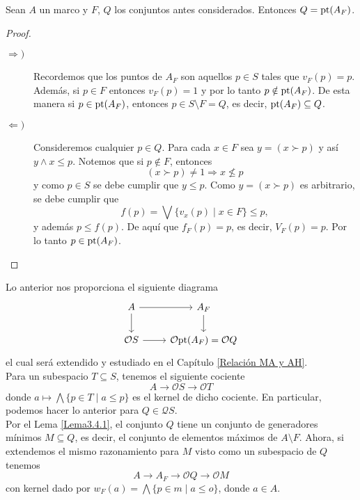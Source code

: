 \begin{lem}\label{Lema5.7.1}
    Sean $A$ un marco y $F$, $Q$ los conjuntos antes considerados. Entonces $Q=\mathrm{pt}(A_F)$.
\end{lem}

\begin{proof}
\begin{description}
    \item[$\Rightarrow) $] Recordemos que los puntos de $A_F$ son aquellos $p\in S$ tales que $v_F(p)=p$. Además, si $p\in F$ entonces $v_F(p)=1$ y por lo tanto $p\notin \mathrm{pt}(A_F)$. De esta manera si $p\in \mathrm{pt}(A_F)$, entonces $p\in S\setminus F=Q$, es decir, $\mathrm{pt}(A_F)\subseteq Q$.
    
    \item[$\Leftarrow) $] Consideremos cualquier $p\in Q$. Para cada $x\in F$ sea $y=(x\succ p)$ y así $y\wedge x\leq p$. Notemos que si $p\notin F$, entonces
    \[
    (x\succ p)\neq 1\Rightarrow x\nleq p
    \]
    y como $p\in S$ se debe cumplir que $y\leq p$. Como $y=(x\succ p)$ es arbitrario, se debe cumplir que
    \[
    f(p)=\bigvee\{v_x(p)\mid x\in F\}\leq p,
    \]
    y además $p\leq f(p)$. De aquí que $f_F(p)=p$, es decir, $V_F(p)=p$. Por lo tanto $p \in \mathrm{pt}(A_F)$. 
    
\end{description}
\end{proof}

Lo anterior nos proporciona el siguiente diagrama
\begin{equation}\label{Qadradito}
    \begin{tikzcd}
	A & {A_F} \\
	{\mathcal{O}S} & {\mathcal{O}\pt(A_F)=\mathcal{O}Q}
	\arrow[from=1-1, to=1-2]
	\arrow[from=1-1, to=2-1]
	\arrow[from=1-2, to=2-2]
	\arrow[from=2-1, to=2-2]
\end{tikzcd}
\end{equation}
el cual será extendido y estudiado en el Capítulo \ref{Relación MA y AH}.\\

Para un subespacio $T\subseteq S$, tenemos el siguiente cociente
\[
A\to \mathcal{O}S\to \mathcal{O}T
\]
donde $a\mapsto \bigwedge \{p\in T\mid a\leq p\}$ es el kernel de dicho cociente. En particular, podemos hacer lo anterior para $Q\in \mathcal{Q}S$.\\

Por el Lema \ref{Lema3.4.1}, el conjunto $Q$ tiene un conjunto de generadores mínimos $M\subseteq Q$, es decir, el conjunto de elementos máximos de $A\setminus F$. Ahora, si extendemos el mismo razonamiento para $M$ visto como un subespacio de $Q$ tenemos
\begin{equation}\label{Cociente a M}
A\to A_F \to \mathcal{O}Q \to \mathcal{O}M
\end{equation}
con kernel dado por $w_F(a)=\bigwedge \{p\in m\mid a\leq o\}$, donde $a\in A$. 

